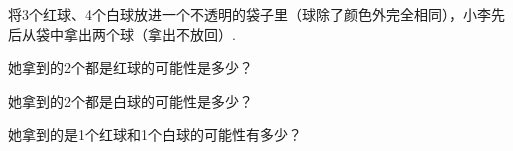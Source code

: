 将3个红球、4个白球放进一个不透明的袋子里（球除了颜色外完全相同），小李先后从袋中拿出两个球（拿出不放回）.

\begin{subquestions}

    \subquestion 她拿到的2个都是红球的可能性是多少？

    \subquestion 她拿到的2个都是白球的可能性是多少？

    \subquestion 她拿到的是1个红球和1个白球的可能性有多少？

\end{subquestions}





